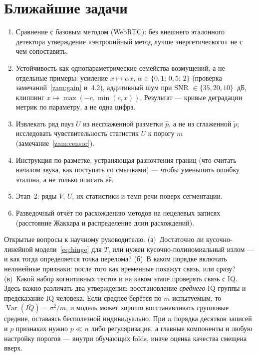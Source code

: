 \documentclass[11pt,a4paper]{article}
\theoremstyle{definition}
\theoremstyle{plain}
\begin{document}
\section{Ближайшие задачи}

\begin{enumerate}[leftmargin=1.6em]
  \item Сравнение с базовым методом (WebRTC): без внешнего эталонного детектора
        утверждение «энтропийный метод лучше энергетического» не с чем
        сопоставить.
  \item Устойчивость как однопараметрические семейства возмущений, а не
        отдельные примеры: усиление $x\mapsto\alpha x$,
        $\alpha\in\{0{,}1;\,0{,}5;\,2\}$ (проверка замечаний~\ref{zam:gain}
        и~4.2), аддитивный шум при SNR $\in\{35,20,10\}$~дБ, клиппинг
        $x\mapsto\max(-c,\min(c,x))$. Результат --- кривые деградации метрик по
        параметру, а не одна цифра.
  \item Извлекать ряд пауз $U$ из несглаженной разметки $\hat p$, а не из
        сглаженной $\tilde p$; исследовать чувствительность статистик $U$ к
        порогу $m$ (замечание~\ref{zam:censor}).
  \item Инструкция по разметке, устраняющая разночтения границ (что считать
        началом звука, как поступать со смычками) --- чтобы уменьшить ошибку
        эталона, а не только описать её.
  \item Этап~2: ряды $V$, $U$, их статистики и темп речи поверх сегментации.
  \item Разведочный отчёт по расхождению методов на нецелевых записях
        (расстояние Жаккара и распределение длин расхождений).
\end{enumerate}

Открытые вопросы к научному руководителю.
(а)~Достаточно ли кусочно-линейной модели~\eqref{eq:hinge} для $T$, или нужен
кусочно-полиномиальный излом --- и как тогда определяется точка перелома?
(б)~В каком порядке включать нелинейные признаки: после того как временные
покажут связь, или сразу?
(в)~Какой набор когнитивных тестов и на каком этапе проверять связь с IQ.
Здесь важно различать два утверждения: восстановление \emph{среднего} IQ
группы и предсказание IQ человека. Если среднее берётся по $m$ испытуемым, то
$\operatorname{Var}(\overline{IQ})=\sigma^2/m$, и модель может хорошо
восстанавливать групповые средние, оставаясь бесполезной индивидуально. При
$n$ порядка десятков записей и $p$ признаках нужно $p\ll n$ либо регуляризация,
а главные компоненты и любую настройку порогов --- внутри обучающих folds,
иначе оценка качества смещена вверх.
\end{document}
